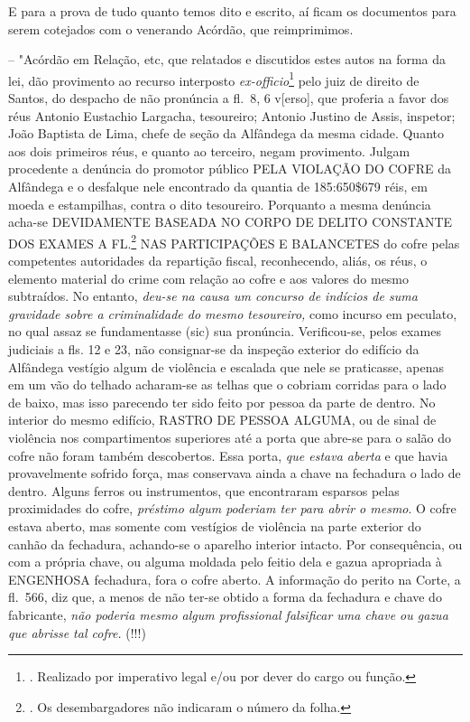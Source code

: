 E para a prova de tudo quanto temos dito e escrito, aí ficam os
documentos para serem cotejados com o venerando Acórdão, que
reimprimimos.

-- "Acórdão em Relação, etc, que relatados e discutidos estes autos na
forma da lei, dão provimento ao recurso interposto
\emph{ex-officio}\footnote{. Realizado por imperativo legal e/ou por
  dever do cargo ou função.} pelo juiz de direito de Santos, do despacho
de não pronúncia a fl.~8, 6 v{[}erso{]}, que proferia a favor dos réus
Antonio Eustachio Largacha, tesoureiro; Antonio Justino de Assis,
inspetor; João Baptista de Lima, chefe de seção da Alfândega da mesma
cidade. Quanto aos dois primeiros réus, e quanto ao terceiro, negam
provimento. Julgam procedente a denúncia do promotor público PELA
VIOLAÇÃO DO COFRE da Alfândega e o desfalque nele encontrado da quantia
de 185:650\$679 réis, em moeda e estampilhas, contra o dito tesoureiro.
Porquanto a mesma denúncia acha-se DEVIDAMENTE BASEADA NO CORPO DE
DELITO CONSTANTE DOS EXAMES A FL.\footnote{. Os desembargadores não
  indicaram o número da folha.} NAS PARTICIPAÇÕES E BALANCETES do cofre
pelas competentes autoridades da repartição fiscal, reconhecendo, aliás,
os réus, o elemento material do crime com relação ao cofre e aos valores
do mesmo subtraídos. No entanto, \emph{deu-se na causa um concurso de
indícios de suma gravidade sobre a criminalidade do mesmo tesoureiro,}
como incurso em peculato, no qual assaz se fundamentasse (sic) sua
pronúncia. Verificou-se, pelos exames judiciais a fls. 12 e 23, não
consignar-se da inspeção exterior do edifício da Alfândega vestígio
algum de violência e escalada que nele se praticasse, apenas em um vão
do telhado acharam-se as telhas que o cobriam corridas para o lado de
baixo, mas isso parecendo ter sido feito por pessoa da parte de dentro.
No interior do mesmo edifício, RASTRO DE PESSOA ALGUMA, ou de sinal de
violência nos compartimentos superiores até a porta que abre-se para o
salão do cofre não foram também descobertos. Essa porta, \emph{que
estava aberta} e que havia provavelmente sofrido força, mas conservava
ainda a chave na fechadura o lado de dentro. Alguns ferros ou
instrumentos, que encontraram esparsos pelas proximidades do cofre,
\emph{préstimo algum poderiam ter para abrir o mesmo}. O cofre estava
aberto, mas somente com vestígios de violência na parte exterior do
canhão da fechadura, achando-se o aparelho interior intacto. Por
consequência, ou com a própria chave, ou alguma moldada pelo feitio dela
e gazua apropriada à ENGENHOSA fechadura, fora o cofre aberto. A
informação do perito na Corte, a fl.~566, diz que, a menos de não ter-se
obtido a forma da fechadura e chave do fabricante, \emph{não poderia
mesmo algum profissional falsificar uma chave ou gazua que abrisse tal
cofre.} (!!!)

